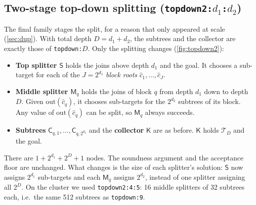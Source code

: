 \documentclass[11pt,a4paper]{article}
\newcommand{\dfam}[1]{\texttt{#1}}
\newcommand{\outb}{\mathrm{out}}
\newcommand{\nS}{\mathsf{S}}\newcommand{\nK}{\mathsf{K}}\newcommand{\nC}{\mathsf{C}}
\newcommand{\nM}{\mathsf{M}}\newcommand{\nA}{\mathsf{A}}\newcommand{\nB}{\mathsf{B}}
\begin{document}
\subsection{Two-stage top-down splitting (\dfam{topdown2:$d_1$:$d_2$})}
\label{sec:topdown2}
The final family stages the split, for a reason that only appeared at scale
(\cref{sec:dup}). With total depth $D=d_1+d_2$, the subtrees and the collector are exactly
those of \dfam{topdown:$D$}. Only the splitting changes (\cref{fig:topdown2}):
\begin{itemize}
\item \textbf{Top splitter $\nS$} holds the joins above depth $d_1$ and the goal. It chooses a
      sub-target for each of the $J=2^{d_1}$ \emph{block roots} $\hat c_1,\dots,\hat c_J$.
\item \textbf{Middle splitter $\nM_q$} holds the joins of block $q$ from depth $d_1$ down to
      depth $D$. Given $\outb(\hat c_q)$, it chooses sub-targets for the $2^{d_2}$ subtrees of
      its block. Any value of $\outb(\hat c_q)$ can be split, so $\nM_q$ always succeeds.
\item \textbf{Subtrees} $\nC_{q,1},\dots,\nC_{q,2^{d_2}}$ and the \textbf{collector} $\nK$ are
      as before. $\nK$ holds $\mathcal{T}_D$ and the goal.
\end{itemize}
There are $1+2^{d_1}+2^{D}+1$ nodes. The soundness argument and the acceptance floor are
unchanged. What changes is the size of each splitter's solution: $\nS$ now assigns $2^{d_1}$
sub-targets and each $\nM_q$ assigns $2^{d_2}$, instead of one splitter assigning all $2^D$.
On the cluster we used \dfam{topdown2:4:5}: 16 middle splitters of 32 subtrees each, i.e.\ the same
512 subtrees as \dfam{topdown:9}.
\end{document}
